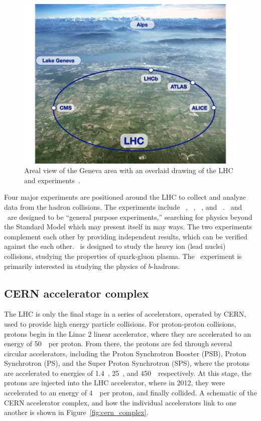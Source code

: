 \begin{figure}[ht]
  \centering
  \includegraphics[width=\textwidth, clip=true, trim=0 0 1cm 0]
    {figs/lhc/lhc_aerial.pdf}
  \caption{
    Areal view of the Geneva area with an overlaid drawing of the LHC
    and experiments~\cite{lhc_aerial}.
  }
  \label{fig:lhc_aerial}
\end{figure}

Four major experiments are positioned around the LHC to collect and analyze
data from the hadron collisions.
The experiments include \atlas~\cite{cern-jinst-atlas},
\cms~\cite{cern-jinst-cms}, \alice~\cite{cern-jinst-alice}, and
\lhcb~\cite{cern-jinst-lhcb}.
\atlas\ and \cms\ are designed to be ``general purpose experiments,'' searching
for physics beyond the Standard Model which may present itself in may ways.
The two experiments complement each other by providing independent results,
which can be verified against the each other.
\alice\ is designed to study the heavy ion (lead nuclei) collisions, studying
the properties of quark-gluon plasma.
The \lhcb\ experiment is primarily interested in studying the physics of
$b$-hadrons.

\FloatBarrier
\subsection{CERN accelerator complex}
\label{sec:accelerator_complex}

The LHC is only the final stage in a series of accelerators, operated by CERN,
used to provide high energy particle collisions.
For proton-proton collisions, protons begin in the Linac 2 linear
accelerator, where they are accelerated to an energy of 50~\MeV\ per proton.
From there, the protons are fed through several circular accelerators, including
the Proton Synchrotron Booster (PSB), Proton Synchrotron (PS), and the Super
Proton Synchrotron (SPS), where the protons are accelerated to energies of
1.4~\GeV, 25~\GeV, and 450~\GeV\ respectively.
At this stage, the protons are injected into the LHC accelerator, where 
in 2012, they were accelerated to an energy of 4~\TeV\ per proton, and finally
collided.
A schematic of the CERN accelerator complex, and how the individual
accelerators link to one another is shown in Figure~\ref{fig:cern_complex}.

